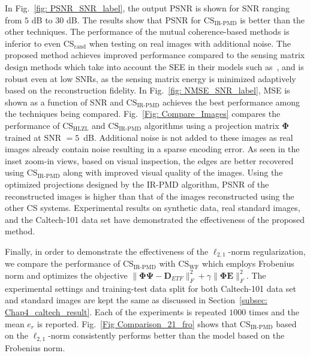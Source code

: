 In Fig.~\ref{fig: PSNR_SNR_label}, the output PSNR is shown for SNR ranging from $5$ dB to $30$ dB. The results show that PSNR for $\text{CS}_{\text{IR-PMD}}$ is better than the other techniques. The performance of the mutual coherence-based methods is inferior to even $\text{CS}_{\text{rand}}$ when testing on real images with additional noise. The proposed method achieves improved performance compared to the sensing matrix design methods which take into account the SEE in their models such as~\cite{HONG_robust, HONG_sparse, SRE_Huang}, and is robust even at low SNRs, as the sensing matrix energy is minimized adaptively based on the reconstruction fidelity. %
In Fig.~\ref{fig: NMSE_SNR_label}, MSE is shown as a function of SNR and $\text{CS}_{\text{IR-PMD}}$ achieves the best performance among the techniques being compared. Fig.~\ref{Fig: Compare_Images} compares the performance of $\text{CS}_{\text{HLZL}}$ and $\text{CS}_{\text{IR-PMD}}$ algorithms using a projection matrix $\bm{\Phi}$ trained at SNR $=5$~dB. Additional noise is not added to these images as real images already contain noise resulting in a sparse encoding error.
As seen in the inset zoom-in views, based on visual inspection, the edges are better recovered using $\text{CS}_{\text{IR-PMD}}$ along with improved visual quality of the images.
Using the optimized projections designed by the IR-PMD algorithm, PSNR of the reconstructed images is higher than that of the images reconstructed using the other CS systems. Experimental results on synthetic data, real standard images, and the Caltech-101 data set have demonstrated the effectiveness of the proposed method.

Finally, in order to demonstrate the effectiveness of the $\ell_{2,1}$-norm regularization, we compare the performance of $\text{CS}_{\text{IR-PMD}}$ with $\text{CS}_{\text{WF}}$ which employs Frobenius norm and optimizes the objective $\| \bm{\Phi} \bm{\Psi} - \bm{D}_{ETF} \|_{F}^{2} + \gamma \| \bm{\Phi} \bm{E} \|_{F}^{2}$. The experimental settings and training-test data split for both Caltech-101 data set and standard images are kept the same as discussed in Section~\ref{subsec: Chap4_caltech_result}. Each of the experiments is repeated $1000$ times and the mean $e_r$ is reported. Fig.~\ref{Fig Comparison_21_fro} shows that $\text{CS}_{\text{IR-PMD}}$ based on the $\ell_{2,1}$-norm consistently performs better than the model based on the Frobenius norm.
%
